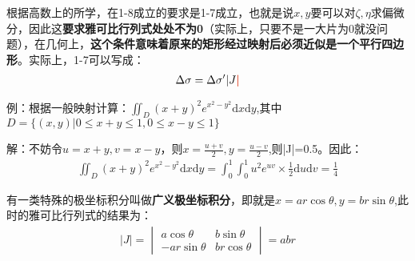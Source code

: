 \documentclass{ctexart}
\let\oldtextbf\textbf
\renewcommand{\textbf}[1]{\textcolor{brown!50!red}{\oldtextbf{#1}}}
\begin{document}
根据高数上的所学，在1-8成立的要求是1-7成立，也就是说$x,y$要可以对$\zeta,\eta$求偏微分，因此这\textbf{\color{brown!50!red}要求雅可比行列式处处不为0}（实际上，只要不是一大片为0就没问题），在几何上，\textbf{\color{brown!50!red}这个条件意味着原来的矩形经过映射后必须近似是一个平行四边形}。实际上，1-7可以写成：
\begin{align*}
    \Delta \sigma=\Delta \sigma' |J\textbf{\color{brown!50!red}|}
\end{align*}

例：根据一般映射计算：$\iint_D (x+y)^2e^{x^2-y^2}\mathrm{d}x\mathrm{d}y$,其中$D=\{(x,y)|0\leq x+y\leq 1,0\leq x-y \leq 1\}$

解：不妨令$u=x+y,v=x-y$，则$x=\frac{u+v}{2},y=\frac{u-v}{2}$,则|J|=0.5。因此：
\begin{align*}
\iint_D (x+y)^2e^{x^2-y^2}\mathrm{d}x\mathrm{d}y=\int_0^1\int_0^1u^2e^{uv}\times \frac{1}{2}
\mathrm{d}u\mathrm{d}v =\frac{1}{4}  
\end{align*}

有一类特殊的极坐标积分叫做\textbf{\color{brown!50!red}广义极坐标积分}，即就是$x=ar\cos\theta,y=br\sin\theta$,此时的雅可比行列式的结果为：
\begin{align*}
|J|=\begin{vmatrix}
 a\cos\theta &  b\sin\theta\\
 -ar\sin\theta & br\cos\theta
\end{vmatrix}=abr\tag{1-9}
\end{align*}
\end{document}
